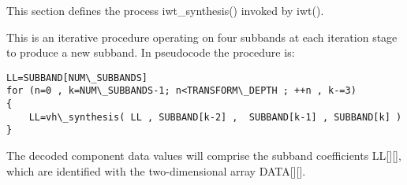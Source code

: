 
This section defines the process iwt\_synthesis() invoked by iwt().

This is an iterative procedure operating on four subbands at each
iteration stage to produce a new subband. In pseudocode the procedure
is:

\begin{verbatim}
LL=SUBBAND[NUM\_SUBBANDS]
for (n=0 , k=NUM\_SUBBANDS-1; n<TRANSFORM\_DEPTH ; ++n , k-=3)
{
    LL=vh\_synthesis( LL , SUBBAND[k-2] ,  SUBBAND[k-1] , SUBBAND[k] )
}
\end{verbatim}

The decoded component data values will comprise the subband coefficients
LL[][], which are identified with the two-dimensional array DATA[][].


